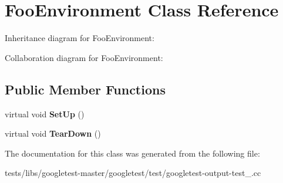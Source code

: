 \hypertarget{classFooEnvironment}{}\section{Foo\+Environment Class Reference}
\label{classFooEnvironment}


Inheritance diagram for Foo\+Environment\+:


Collaboration diagram for Foo\+Environment\+:
\subsection*{Public Member Functions}
\begin{DoxyCompactItemize}
\item 
\mbox{\label{classFooEnvironment_a7db8d8b312805aff437ae8534132a56d}} 
virtual void {\bfseries Set\+Up} ()
\item 
\mbox{\label{classFooEnvironment_a99a2c9df52106cce9e7a4bdda53df802}} 
virtual void {\bfseries Tear\+Down} ()
\end{DoxyCompactItemize}


The documentation for this class was generated from the following file\+:\begin{DoxyCompactItemize}
\item 
tests/libs/googletest-\/master/googletest/test/googletest-\/output-\/test\+\_\+.\+cc\end{DoxyCompactItemize}
